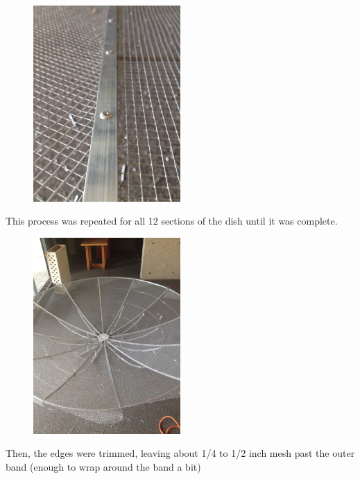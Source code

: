 \documentclass[11pt]{article} %
\begin{document}
\begin{figure}
  \centering
  \caption{   }
  \includegraphics[width=0.50\textwidth]{dish/15.jpeg}
\end{figure}


This process was repeated for all 12 sections of the dish until it was complete.

\begin{figure}
  \centering
  \caption{   }
  \includegraphics[width=0.50\textwidth]{dish/16.jpeg}
\end{figure}

Then, the edges were trimmed, leaving about 1/4 to 1/2 inch mesh past the outer band (enough to wrap around the band a bit)
\end{document}
